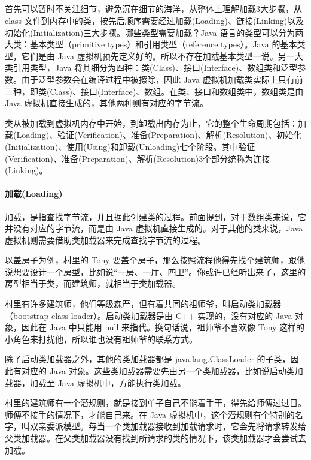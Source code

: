 \documentclass[../../../interview-questions.tex]{subfiles}
\begin{document}
\subsection{\color{red}{Java虚拟机如何加载类}}

首先可以暂时不关注细节，避免沉在细节的海洋，从整体上理解加载3大步骤，从 class 文件到内存中的类，按先后顺序需要经过加载(Loading)、链接(Linking)以及初始化(Initialization)三大步骤。哪些类型需要加载？Java 语言的类型可以分为两大类：基本类型（primitive types）和引用类型（reference types）。Java 的基本类型，它们是由 Java 虚拟机预先定义好的。所以不存在加载基本类型一说。另一大类引用类型，Java 将其细分为四种：类(Class)、接口(Interface)、数组类和泛型参数。由于泛型参数会在编译过程中被擦除，因此 Java 虚拟机加载类实际上只有前三种，即类(Class)、接口(Interface)、数组。在类、接口和数组类中，数组类是由 Java 虚拟机直接生成的，其他两种则有对应的字节流。



类从被加载到虚拟机内存中开始，到卸载出内存为止，它的整个生命周期包括：加载(Loading)、验证(Verification)、准备(Preparation)、解析(Resolution)、初始化(Initialization)、使用(Using)和卸载(Unloading)七个阶段。其中验证(Verification)、准备(Preparation)、解析(Resolution)3个部分统称为连接(Linking)。

\paragraph{加载(Loading)}

加载，是指查找字节流，并且据此创建类的过程。前面提到，对于数组类来说，它并没有对应的字节流，而是由 Java 虚拟机直接生成的。对于其他的类来说，Java 虚拟机则需要借助类加载器来完成查找字节流的过程。

以盖房子为例，村里的 Tony 要盖个房子，那么按照流程他得先找个建筑师，跟他说想要设计一个房型，比如说“一房、一厅、四卫”。你或许已经听出来了，这里的房型相当于类，而建筑师，就相当于类加载器。

村里有许多建筑师，他们等级森严，但有着共同的祖师爷，叫启动类加载器（bootstrap class loader）。启动类加载器是由 C++ 实现的，没有对应的 Java 对象，因此在 Java 中只能用 null 来指代。换句话说，祖师爷不喜欢像 Tony 这样的小角色来打扰他，所以谁也没有祖师爷的联系方式。

除了启动类加载器之外，其他的类加载器都是 java.lang.ClassLoader 的子类，因此有对应的 Java 对象。这些类加载器需要先由另一个类加载器，比如说启动类加载器，加载至 Java 虚拟机中，方能执行类加载。

村里的建筑师有一个潜规则，就是接到单子自己不能着手干，得先给师傅过过目。师傅不接手的情况下，才能自己来。在 Java 虚拟机中，这个潜规则有个特别的名字，叫双亲委派模型。每当一个类加载器接收到加载请求时，它会先将请求转发给父类加载器。在父类加载器没有找到所请求的类的情况下，该类加载器才会尝试去加载。
\end{document}
